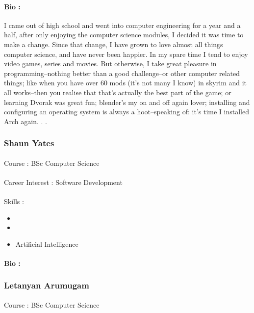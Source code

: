 \documentclass[11pt]{article}
\begin{document}
\paragraph{Bio :} I came out of high school and went into computer engineering for a year and a half, after only enjoying the computer science modules, I decided it was time to make a change. Since that change, I have grown to love almost all things computer science, and have never been happier.
In my spare time I tend to enjoy video games, series and movies. But otherwise, I take great pleasure in programming--nothing better than a good challenge--or other computer related things; like when you have over 60 mods (it's not many I know) in skyrim and it all works--then you realise that that's actually the best part of the game; or learning Dvorak was great fun; blender's my on and off again lover; installing and configuring an operating system is always a hoot--speaking of: it's time I installed Arch again. . .


\subsubsection{Shaun Yates}
\paragraph{}Course : BSc Computer Science
\paragraph{}Career Interest : Software Development
\paragraph{}Skills : 
\begin{itemize}
\item 
\item 
\item Artificial Intelligence
\end{itemize}
\paragraph{Bio :} 
\subsubsection{Letanyan Arumugam}
\paragraph{}Course : BSc Computer Science 
\end{document}
